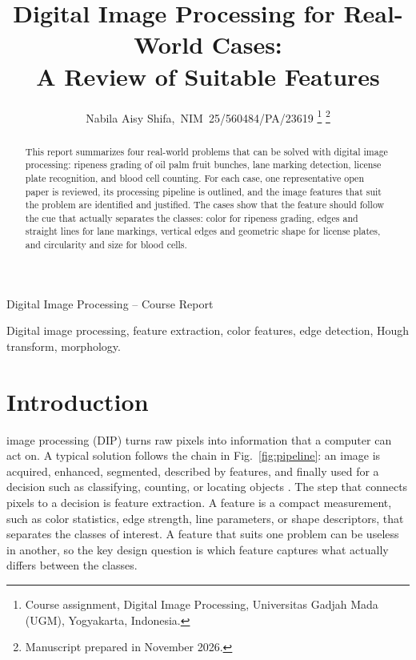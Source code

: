 \documentclass[lettersize,journal]{IEEEtran}
\begin{document}
\title{Digital Image Processing for Real-World Cases:\\ A Review of Suitable Features}

\author{Nabila Aisy Shifa,~NIM~25/560484/PA/23619
\thanks{Course assignment, Digital Image Processing, Universitas Gadjah Mada (UGM), Yogyakarta, Indonesia.}
\thanks{Manuscript prepared in November 2026.}}

%
{Digital Image Processing -- Course Report}

\maketitle

\begin{abstract}
This report summarizes four real-world problems that can be solved with digital image processing: ripeness grading of oil palm fruit bunches, lane marking detection, license plate recognition, and blood cell counting. For each case, one representative open paper is reviewed, its processing pipeline is outlined, and the image features that suit the problem are identified and justified. The cases show that the feature should follow the cue that actually separates the classes: color for ripeness grading, edges and straight lines for lane markings, vertical edges and geometric shape for license plates, and circularity and size for blood cells.
\end{abstract}

\begin{IEEEkeywords}
Digital image processing, feature extraction, color features, edge detection, Hough transform, morphology.
\end{IEEEkeywords}

\section{Introduction}
 image processing (DIP) turns raw pixels into information that a computer can act on. A typical solution follows the chain in Fig.~\ref{fig:pipeline}: an image is acquired, enhanced, segmented, described by features, and finally used for a decision such as classifying, counting, or locating objects \cite{gw}. The step that connects pixels to a decision is feature extraction. A feature is a compact measurement, such as color statistics, edge strength, line parameters, or shape descriptors, that separates the classes of interest. A feature that suits one problem can be useless in another, so the key design question is which feature captures what actually differs between the classes.
\end{document}
